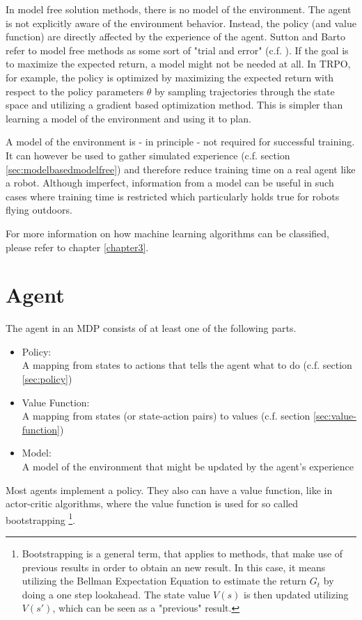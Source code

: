 In model free solution methods, there is no model of the environment. The agent is not explicitly aware of the environment behavior. Instead, the policy (and value function) are directly affected by the experience of the agent. Sutton and Barto refer to model free methods as some sort of "trial and error" (c.f. \cite[section~1.5]{SuttonBarto2018}). If the goal is to maximize the expected return, a model might not be needed at all. In TRPO, for example, the policy is optimized by maximizing the expected return with respect to the policy parameters $\theta$ by sampling trajectories through the state space and utilizing a gradient based optimization method. This is simpler than learning a model of the environment and using it to plan.

A model of the environment is - in principle - not required for successful training. It can however be used to gather simulated experience (c.f. section \ref{sec:modelbasedmodelfree}) and therefore reduce training time on a real agent like a robot. Although imperfect, information from a model can be useful in such cases where training time is restricted which particularly holds true for robots flying outdoors.

For more information on how machine learning algorithms can be classified, please refer to chapter \ref{chapter3}.

\section{Agent}

The agent in an MDP consists of at least one of the following parts.

\begin{itemize}
	\item Policy: \\
	A mapping from states to actions that tells the agent what to do (c.f. section \ref{sec:policy})
	\item Value Function: \\
	A mapping from states (or state-action pairs) to values (c.f. section \ref{sec:value-function})
	\item Model: \\
	A model of the environment that might be updated by the agent's experience
\end{itemize}

Most agents implement a policy. They also can have a value function, like in actor-critic algorithms, where the value function is used for so called bootstrapping \footnote{Bootstrapping is a general term, that applies to methods, that make use of previous results in order to obtain an new result. In this case, it means utilizing the Bellman Expectation Equation to estimate the return $G_t$ by doing a one step lookahead. The state value $V(s)$ is then updated utilizing $V(s')$, which can be seen as a "previous" result.}.

